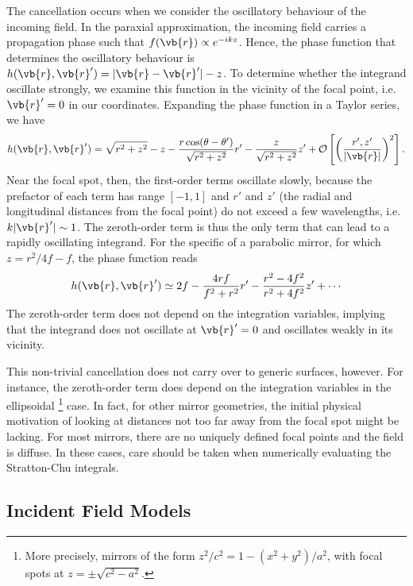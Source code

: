 \documentclass[11pt,SymmetricalJury]{inrsthesis/inrsthesis}
\begin{document}
The cancellation occurs when we consider the oscillatory behaviour of the
incoming field. In the paraxial approximation, the incoming field carries a
propagation phase such that $f(\vb{r})\propto e^{-ikz}$. Hence, the phase
function that determines the oscillatory behaviour is
$h(\vb{r},\vb{r}')=|\vb{r}-\vb{r}'|-z$. To determine whether the integrand
oscillate strongly, we examine this function in the vicinity of the focal point,
i.e. $\vb{r}'=0$ in our coordinates. Expanding the phase function in a Taylor
series, we have
  \begin{equation}
    h(\vb{r},\vb{r}') = \sqrt{r^2+z^2}-z
                  -\frac{r\cos(\theta-\theta')}{\sqrt{r^2+z^2}} r'
                  -\frac{z}{\sqrt{r^2+z^2}}z'
                  + \mathcal{O}\left[\left(\frac{r',z'}{|\vb{r}|}\right)^2\right].
  \end{equation}
Near the focal spot, then, the first-order terms oscillate slowly, because the
prefactor of each term has range $[-1,1]$ and $r'$ and $z'$ (the radial and
longitudinal distances from the focal point) do not exceed a few wavelengths,
i.e. $k|\vb{r}'|\sim1$. The zeroth-order term is thus the only term that can
lead to a rapidly oscillating integrand. For the specific of a parabolic mirror,
for which $z=r^2/4f-f$, the phase function reads
  \begin{equation}
    h(\vb{r},\vb{r}')\simeq 2f - \frac{4rf}{f^2+r^2} r' - \frac{r^2-4f^2}{r^2+4f^2} z' + \cdots
    \label{eq:sc.parabola-phase-taylor}
  \end{equation}
The zeroth-order term does not depend on the integration variables, implying
that the integrand does not oscillate at $\vb{r}'=0$ and oscillates weakly
in its vicinity.

This non-trivial cancellation does not carry over to generic surfaces, however.
For instance, the zeroth-order term does depend on the integration variables
in the ellipsoidal \footnote{More precisely,
mirrors of the form $z^2/c^2=1-(x^2+y^2)/a^2$, with focal spots
at $z=\pm\sqrt{c^2-a^2}$.} case. In fact, for other mirror geometries, the initial
physical motivation of looking at distances not too far away from the focal spot
might be lacking. For most mirrors, there are no uniquely
defined focal points and the field is diffuse. In these cases, care
should be taken when numerically evaluating the Stratton-Chu integrals.

\subsection{Incident Field Models}
\end{document}
